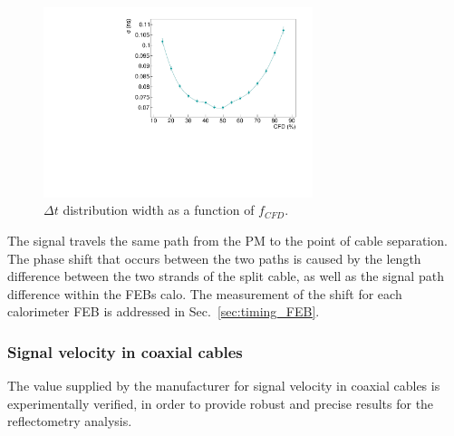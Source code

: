 \begin{figure}[h!]
  \centering
  \includegraphics[width=0.7\textwidth]{commissioning/fig_commissioning/CFD_study.pdf}
  \caption{$\Delta t$ distribution width as a function of $f_{CFD}$.
    \label{fig:CFD_study}}
\end{figure}

The signal travels the same path from the PM to the point of cable separation.
The phase shift that occurs between the two paths is caused by the length difference between the two strands of the split cable, as well as the signal path difference within the FEBs calo.
The measurement of the shift for each calorimeter FEB is addressed in Sec.~\ref{sec:timing_FEB}.

\subsubsection*{Signal velocity in coaxial cables}

The value supplied by the manufacturer for signal velocity in coaxial cables is experimentally verified, in order to provide robust and precise results for the reflectometry analysis.

